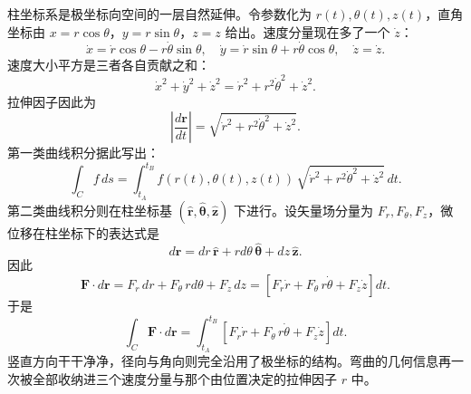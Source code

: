 \documentclass[UTF8]{ctexbook}
\begin{document}
柱坐标系是极坐标向空间的一层自然延伸。令参数化为 $r(t), \theta(t), z(t)$，直角坐标由 $x = r\cos\theta$，$y = r\sin\theta$，$z = z$ 给出。速度分量现在多了一个 $\dot{z}$：
\[
\dot{x} = \dot{r} \cos\theta - r \dot{\theta} \sin\theta, \quad
\dot{y} = \dot{r} \sin\theta + r \dot{\theta} \cos\theta, \quad
\dot{z} = \dot{z}.
\]
速度大小平方是三者各自贡献之和：
\[
\dot{x}^2 + \dot{y}^2 + \dot{z}^2 = \dot{r}^2 + r^2 \dot{\theta}^2 + \dot{z}^2.
\]
拉伸因子因此为
\[
\left|\frac{d\mathbf{r}}{dt}\right| = \sqrt{\dot{r}^2 + r^2 \dot{\theta}^2 + \dot{z}^2}.
\]
第一类曲线积分据此写出：
\[
\int_C f \, ds = \int_{t_A}^{t_B} f(r(t), \theta(t), z(t)) \, \sqrt{\dot{r}^2 + r^2 \dot{\theta}^2 + \dot{z}^2} \, dt.
\]
第二类曲线积分则在柱坐标基 $(\hat{\mathbf{r}}, \hat{\boldsymbol{\theta}}, \hat{\mathbf{z}})$ 下进行。设矢量场分量为 $F_r, F_\theta, F_z$，微位移在柱坐标下的表达式是
\[
d\mathbf{r} = dr \, \hat{\mathbf{r}} + r d\theta \, \hat{\boldsymbol{\theta}} + dz \, \hat{\mathbf{z}}.
\]
因此
\[
\mathbf{F} \cdot d\mathbf{r} = F_r \, dr + F_\theta \, r d\theta + F_z \, dz
    = \left[ F_r \dot{r} + F_\theta \, r \dot{\theta} + F_z \dot{z} \right] dt.
\]
于是
\[
\int_C \mathbf{F} \cdot d\mathbf{r} = \int_{t_A}^{t_B} \left[ F_r \dot{r} + F_\theta \, r \dot{\theta} + F_z \dot{z} \right] dt.
\]
竖直方向干干净净，径向与角向则完全沿用了极坐标的结构。弯曲的几何信息再一次被全部收纳进三个速度分量与那个由位置决定的拉伸因子 $r$ 中。
\end{document}
